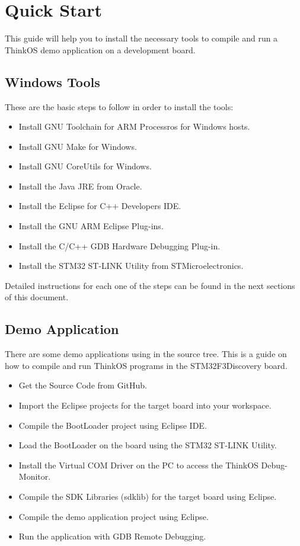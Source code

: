 \section {Quick Start}

This guide will help you to install the necessary tools to compile and run a ThinkOS demo application on a development board.

\subsection{Windows Tools}

These are the basic steps to follow in order to install the tools: 

\begin{itemize}
\item Install GNU Toolchain for ARM Processros for Windows hosts.
\item Install GNU Make for Windows.
\item Install GNU CoreUtils for Windows.
\item Install the Java JRE from Oracle.
\item Install the Eclipse for C++ Developers IDE.
\item Install the GNU ARM Eclipse Plug-ins.
\item Install the C/C++ GDB Hardware Debugging Plug-in.
\item Install the STM32 ST-LINK Utility from STMicroelectronics.
\end{itemize}

Detailed instructions for each one of the steps can be found in the next sections of this document. 

\subsection{Demo Application}
There are some demo applications using \ThinkOS in the source tree. This is a guide on how to compile and run ThinkOS programs in the STM32F3Discovery board. 


\begin{itemize}
\item Get the \ThinkOS Source Code from GitHub.
\item Import the Eclipse projects for the target board into your workspace.
\item Compile the \ThinkOS BootLoader project using Eclipse IDE.
\item Load the \ThinkOS BootLoader on the board using the STM32 ST-LINK Utility.
\item Install the Virtual COM Driver on the PC to access the ThinkOS Debug-Monitor.
\item Compile the SDK Libraries (sdklib) for the target board using Eclipse.
\item Compile the demo application project using Eclipse.
\item Run the application with GDB Remote Debugging.
\end{itemize}




